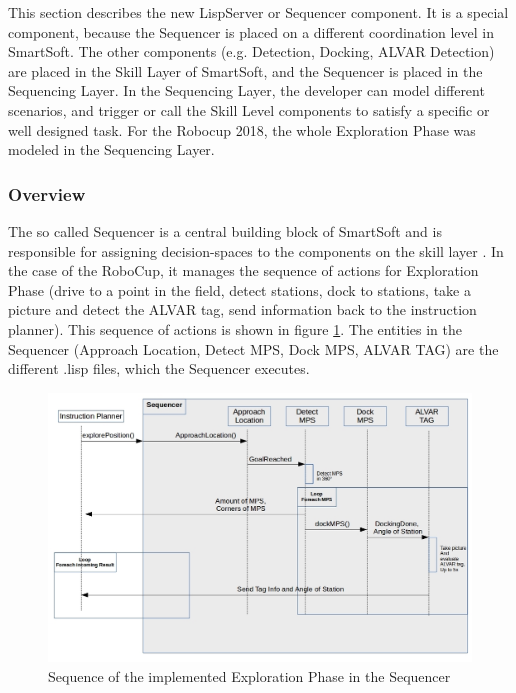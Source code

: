 This section describes the new LispServer or Sequencer component. It is a special component, because the Sequencer is placed on a different coordination level in SmartSoft. The other components (e.g. Detection, Docking, ALVAR Detection) are placed in the Skill Layer of SmartSoft, and the Sequencer is placed in the Sequencing Layer. In the Sequencing Layer, the developer can model different scenarios, and trigger or call the Skill Level components to satisfy a specific or well designed task.
For the Robocup 2018, the whole Exploration Phase was modeled in the Sequencing Layer.

\subsubsection{Overview}
\label{sec:sequencer_overview}
The so called Sequencer is a central building block of SmartSoft and is responsible for assigning decision-spaces to the components on the skill layer \cite{SmartSoftManual}. In the case of the RoboCup, it manages the sequence of actions for Exploration Phase (drive to a point in the field, detect stations, dock to stations, take a picture and detect the ALVAR tag, send information back to the instruction planner). This sequence of actions is shown in figure \ref{fig:sequ_overview}.
The entities in the Sequencer (Approach Location, Detect MPS, Dock MPS, ALVAR TAG) are the different .lisp files, which the Sequencer executes.

\begin{figure}[h]
\centering
\includegraphics[scale=0.5]{pic/sequenceSequencer.jpg}
\caption{Sequence of the implemented Exploration Phase in the Sequencer}
\label{fig:sequ_overview}
\end{figure}


